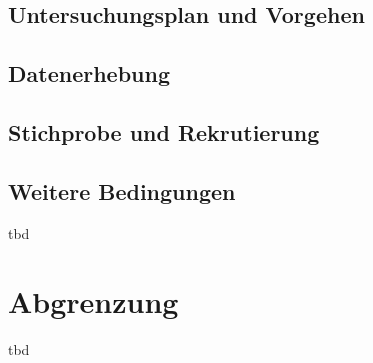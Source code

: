 \subsection*{Untersuchungsplan und Vorgehen}
\subsection*{Datenerhebung}
\subsection*{Stichprobe und Rekrutierung}
\subsection*{Weitere Bedingungen}
tbd
\section*{Abgrenzung}\label{section.abgrenzung}
tbd
